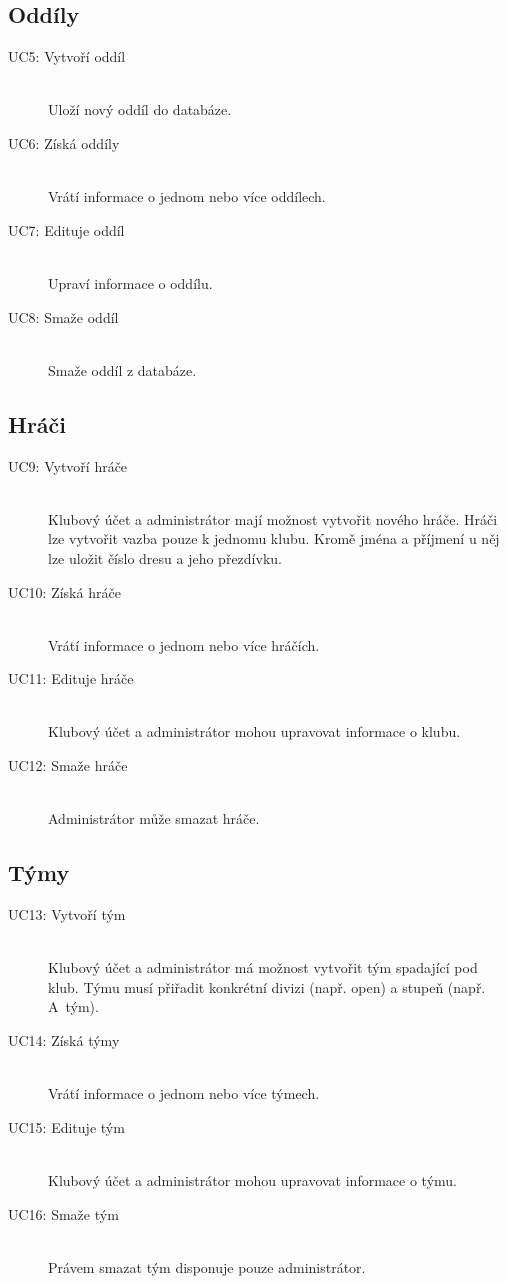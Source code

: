   \subsection*{Oddíly}
    \begin{description}
      \item[UC5: Vytvoří oddíl] \hfill \\
      Uloží nový oddíl do databáze.
      \item[UC6: Získá oddíly] \hfill \\
      Vrátí informace o jednom nebo více oddílech.
      \item[UC7: Edituje oddíl] \hfill \\
      Upraví informace o oddílu.
      \item[UC8: Smaže oddíl] \hfill \\
      Smaže oddíl z databáze.
    \end{description}
  
  \subsection*{Hráči}
    \begin{description}
      \item[UC9: Vytvoří hráče] \hfill \\
      Klubový účet a administrátor mají možnost vytvořit nového hráče. Hráči lze vytvořit vazba
      pouze k jednomu klubu. Kromě jména a příjmení u něj lze uložit číslo dresu a jeho přezdívku.
      \item[UC10: Získá hráče] \hfill \\
      Vrátí informace o jednom nebo více hráčích.
      \item[UC11: Edituje hráče] \hfill \\
      Klubový účet a administrátor mohou upravovat informace o klubu.
      \item[UC12: Smaže hráče] \hfill \\
      Administrátor může smazat hráče.
    \end{description}
  
  \subsection*{Týmy}
    \begin{description}
      \item[UC13: Vytvoří tým] \hfill \\
      Klubový účet a administrátor má možnost vytvořit tým spadající pod klub. Týmu musí přiřadit
      konkrétní divizi (např. open) a stupeň (např. A~tým).
      \item[UC14: Získá týmy] \hfill \\
      Vrátí informace o jednom nebo více týmech.
      \item[UC15: Edituje tým] \hfill \\
      Klubový účet a administrátor mohou upravovat informace o týmu. 
      \item[UC16: Smaže tým] \hfill \\
      Právem smazat tým disponuje pouze administrátor.
    \end{description}
  
